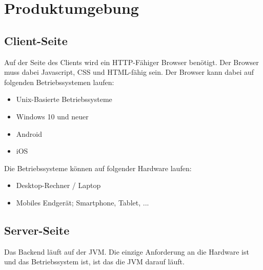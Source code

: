 \section{Produktumgebung}


\subsection{Client-Seite}
Auf der Seite des Clients wird ein HTTP-Fähiger Browser benötigt. Der Browser muss dabei Javascript, CSS und HTML-fähig sein. Der Browser kann dabei auf folgenden Betriebssystemen laufen:

\begin{itemize}
    \item Unix-Basierte Betriebssysteme
    \item Windows 10 und neuer
    \item Android
    \item iOS
\end{itemize}

Die Betriebssysteme können auf folgender Hardware laufen:

\begin{itemize}
    \item Desktop-Rechner / Laptop 
    \item Mobiles Endgerät; Smartphone, Tablet, ...
\end{itemize}

    
\subsection{Server-Seite}
Das Backend läuft auf der JVM. Die einzige Anforderung an die Hardware ist und das Betriebssystem ist, ist das die JVM darauf läuft.